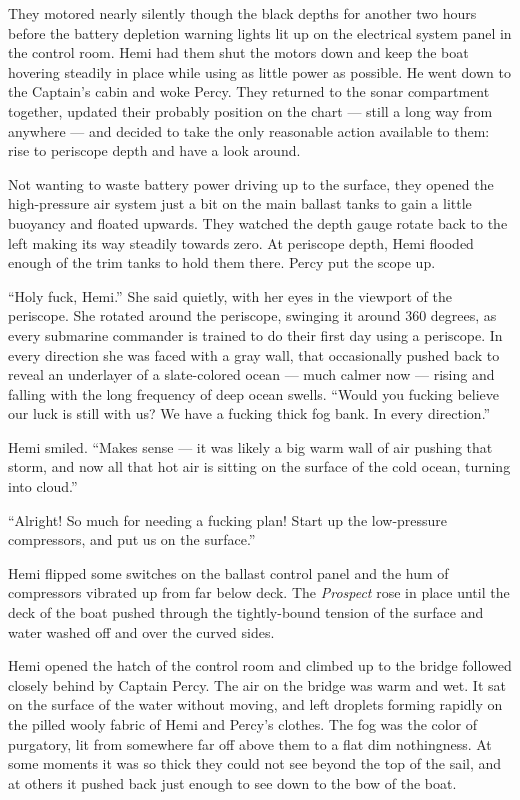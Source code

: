 \documentclass[]{scrbook}
\begin{document}
They motored nearly silently though the black depths for another two
hours before the battery depletion warning lights lit up on the
electrical system panel in the control room. Hemi had them shut the
motors down and keep the boat hovering steadily in place while using as
little power as possible. He went down to the Captain's cabin and woke
Percy. They returned to the sonar compartment together, updated their
probably position on the chart --- still a long way from anywhere ---
and decided to take the only reasonable action available to them: rise
to periscope depth and have a look around.

Not wanting to waste battery power driving up to the surface, they
opened the high-pressure air system just a bit on the main ballast tanks
to gain a little buoyancy and floated upwards. They watched the depth
gauge rotate back to the left making its way steadily towards zero. At
periscope depth, Hemi flooded enough of the trim tanks to hold them
there. Percy put the scope up.

``Holy fuck, Hemi.'' She said quietly, with her eyes in the viewport of
the periscope. She rotated around the periscope, swinging it around 360
degrees, as every submarine commander is trained to do their first day
using a periscope. In every direction she was faced with a gray wall,
that occasionally pushed back to reveal an underlayer of a slate-colored
ocean --- much calmer now --- rising and falling with the long frequency
of deep ocean swells. ``Would you fucking believe our luck is still with
us? We have a fucking thick fog bank. In every direction.''

Hemi smiled. ``Makes sense --- it was likely a big warm wall of air
pushing that storm, and now all that hot air is sitting on the surface
of the cold ocean, turning into cloud.''

``Alright! So much for needing a fucking plan! Start up the low-pressure
compressors, and put us on the surface.''

Hemi flipped some switches on the ballast control panel and the hum of
compressors vibrated up from far below deck. The \emph{Prospect} rose in
place until the deck of the boat pushed through the tightly-bound
tension of the surface and water washed off and over the curved sides.

Hemi opened the hatch of the control room and climbed up to the bridge
followed closely behind by Captain Percy. The air on the bridge was warm
and wet. It sat on the surface of the water without moving, and left
droplets forming rapidly on the pilled wooly fabric of Hemi and Percy's
clothes. The fog was the color of purgatory, lit from somewhere far off
above them to a flat dim nothingness. At some moments it was so thick
they could not see beyond the top of the sail, and at others it pushed
back just enough to see down to the bow of the boat.
\end{document}
